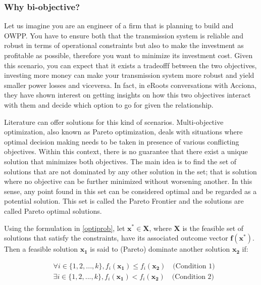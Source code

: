 \documentclass[a4paper,11pt, titlepage, twoside]{article}
\begin{document}
\subsubsection{Why bi-objective?} \label{biobjective}

Let us imagine you are an engineer of a firm that is planning to build and OWPP. You have to ensure both that the transmission system is reliable and robust in terms of operational constraints but also to make the
investment as profitable as possible, therefore you want to minimize its investment cost. Given this scenario, you can expect that it exists a tradeofff between the two objectives, investing more money can make your transmission system more robust and yield smaller power losses and
viceversa. In fact, in eRoots conversations with Acciona, they have shown interest on getting insights on how this two objectives interact with them and decide which option to go for given the relationship.\par

Literature can offer solutions for this kind of scenarios. Multi-objective optimization, also known as Pareto optimization, deals with situations where optimal decision
making needs to be taken in presence of various conflicting objectives.  Within this context, there is no guarantee that there exist a unique solution that minimizes both objectives.
The main idea is to find the set of solutions that are not dominated by any other solution in the set; that is solution where no objective can be further minimized without worsening another. In this sense, any point found in this set can be considered optimal 
and be regarded as a potential solution. This set is called the Pareto Frontier and the solutions are called Pareto optimal solutions.\par

Using the formulation in \ref{optiprob}, let $ \mathbf{x^*} \in \mathbf{X}$, where $\mathbf{X}$ is the feasible set of solutions that satisfy the constraints, have its associated outcome vector $\mathbf{f}(\mathbf{x^*})$.
Then a feasible solution $\mathbf{x_1}$ is said to (Pareto) dominate another solution $\mathbf{x_2}$ if: 

\begin{equation}
\begin{split}
    & \forall i \in \{1, 2, ..., k\}, f_i(\mathbf{x_1}) \leq f_i(\mathbf{x_2}) \quad \text{(Condition 1)} \\
    & \exists i \in \{1, 2, ..., k\}, f_i(\mathbf{x_1}) < f_i(\mathbf{x_2}) \quad \text{(Condition 2)}
\end{split}    
\end{equation}
\end{document}
